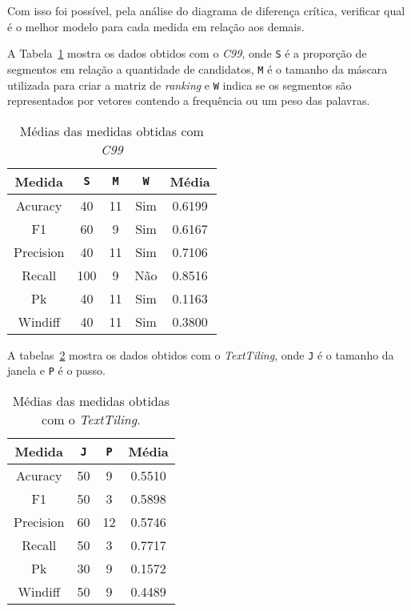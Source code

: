 Com isso foi possível, pela análise do diagrama de diferença crítica, verificar qual é o melhor modelo para cada medida
em relação aos demais. 


A Tabela~\ref{tab:mediasC99} mostra os dados obtidos com o \textit{C99}, onde \texttt{S} é a proporção de segmentos em relação a quantidade de candidatos, \texttt{M} é o tamanho da máscara utilizada para criar a matriz de \textit{ranking} e \texttt{W} indica se os segmentos são representados por vetores contendo a frequência ou um peso das palavras. 



\begin{table}[!h]
	\centering

	\begin{tabular}{|c|c|c|c|c|}
	
		\hline
		Medida & \texttt{S} & \texttt{M} & \texttt{W} & \textbf{Média}\\		
		\hline

		Acuracy		& 40	& 11 & Sim & 0.6199	\\ \hline	
		F1			& 60	& 9	 & Sim & 0.6167	\\ \hline	
		Precision	& 40	& 11 & Sim & 0.7106	\\ \hline			
		Recall		& 100	& 9	 & Não & 0.8516	\\ \hline		
		Pk			& 40	& 11 & Sim & 0.1163	\\ \hline	
		Windiff		& 40	& 11 & Sim & 0.3800	\\ \hline		

		
	\end{tabular}
	
	\caption{Médias das medidas obtidas com \textit{C99}}
	\label{tab:mediasC99}
\end{table}


A tabelas~\ref{tab:mediasTextTiling} mostra os dados obtidos com o \textit{TextTiling}, onde \texttt{J} é o tamanho da janela e \texttt{P} é o passo.

\begin{table}[!h]
	\centering

	\begin{tabular}{|c|c|c|c|}
	
		\hline
		Medida & \texttt{J} & \texttt{P} & \textbf{Média}\\		
		\hline

		Acuracy		& 50 & 9 	& 0.5510 \\ \hline	
		F1			& 50 & 3 	& 0.5898 \\ \hline	
		Precision	& 60 & 12 	& 0.5746 \\ \hline			
		Recall		& 50 & 3 	& 0.7717 \\ \hline		
		Pk			& 30 & 9 	& 0.1572 \\ \hline	
		Windiff		& 50 & 9 	& 0.4489 \\ \hline		

		
	\end{tabular}
	
	\caption{Médias das medidas obtidas com o \textit{TextTiling}.}
	\label{tab:mediasTextTiling}
\end{table}


